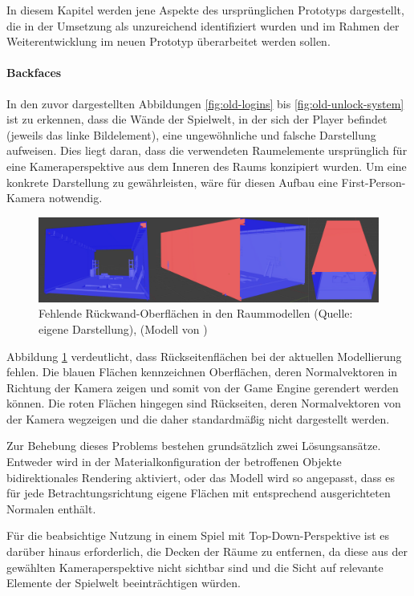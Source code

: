 In diesem Kapitel werden jene Aspekte des ursprünglichen Prototyps dargestellt, die in der Umsetzung als unzureichend identifiziert wurden und im Rahmen der Weiterentwicklung im neuen Prototyp überarbeitet werden sollen.

\paragraph{Backfaces}

In den zuvor dargestellten Abbildungen \ref{fig:old-logins} bis \ref{fig:old-unlock-system} ist zu erkennen, dass die Wände der Spielwelt, in der sich der Player befindet (jeweils das linke Bildelement), eine ungewöhnliche und falsche Darstellung aufweisen. Dies liegt daran, dass die verwendeten Raumelemente ursprünglich für eine Kameraperspektive aus dem Inneren des Raums konzipiert wurden. Um eine konkrete Darstellung zu gewährleisten, wäre für diesen Aufbau eine First-Person-Kamera notwendig.

\begin{figure}[ht]
\centering
\includegraphics[width=1\linewidth]{content/pictures/Backfaces.png}
\caption{Fehlende Rückwand-Oberflächen in den Raummodellen (Quelle: eigene Darstellung), (Modell von \cite{alasl_autolevel_nodate})}
\label{fig:missing-backfaces}
\end{figure}

Abbildung \ref{fig:missing-backfaces} verdeutlicht, dass Rückseitenflächen bei der aktuellen Modellierung fehlen. Die blauen Flächen kennzeichnen Oberflächen, deren Normalvektoren in Richtung der Kamera zeigen und somit von der Game Engine gerendert werden können. Die roten Flächen hingegen sind Rückseiten, deren Normalvektoren von der Kamera wegzeigen und die daher standardmäßig nicht dargestellt werden.

Zur Behebung dieses Problems bestehen grundsätzlich zwei Lösungsansätze. Entweder wird in der Materialkonfiguration der betroffenen Objekte bidirektionales Rendering aktiviert, oder das Modell wird so angepasst, dass es für jede Betrachtungsrichtung eigene Flächen mit entsprechend ausgerichteten Normalen enthält.

Für die beabsichtige Nutzung in einem Spiel mit Top-Down-Perspektive ist es darüber hinaus erforderlich, die Decken der Räume zu entfernen, da diese aus der gewählten Kameraperspektive nicht sichtbar sind und die Sicht auf relevante Elemente der Spielwelt beeinträchtigen würden.


